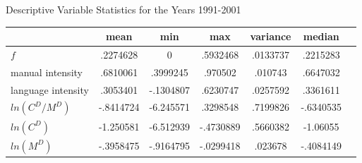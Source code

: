 \caption{Descriptive Variable Statistics for the Years 1991-2001}
\begin{tabular}{lcccccc}
                            & mean      & min       & max       & variance  & median \\
    \hline
    $f$                     & .2274628  & 0         & .5932468  & .0133737  & .2215283 \\
    manual intensity        & .6810061  & .3999245  & .970502   & .010743   & .6647032 \\
    language intensity      & .3053401  & -.1304807 & .6230747  & .0257592  & .3361611 \\
    $ln(C^D/M^D)$           & -.8414724 & -6.245571 & .3298548  & .7199826  & -.6340535 \\
    $ln(C^D)$               & -1.250581 & -6.512939 & -.4730889 & .5660382  & -1.06055 \\
    $ln(M^D)$               & -.3958475 & -.9164795 & -.0299418 & .023678   & -.4084149 \\
\end{tabular}